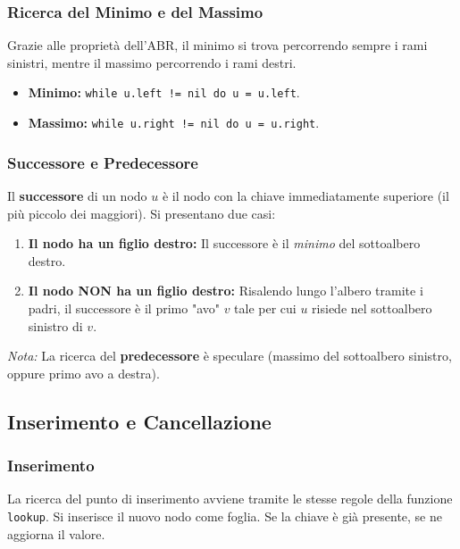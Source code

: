 \documentclass[12pt, a4paper]{article}
\begin{document}
\subsubsection{Ricerca del Minimo e del Massimo}
Grazie alle proprietà dell'ABR, il minimo si trova percorrendo sempre i rami sinistri, mentre il massimo percorrendo i rami destri.
\begin{itemize}
\item \textbf{Minimo:} \texttt{while u.left != nil do u = u.left}.
\item \textbf{Massimo:} \texttt{while u.right != nil do u = u.right}.
\end{itemize}

\subsubsection{Successore e Predecessore}
Il \textbf{successore} di un nodo $u$ è il nodo con la chiave immediatamente superiore (il più piccolo dei maggiori). Si presentano due casi:
\begin{enumerate}
\item \textbf{Il nodo ha un figlio destro:} Il successore è il \textit{minimo} del sottoalbero destro.
\item \textbf{Il nodo NON ha un figlio destro:} Risalendo lungo l'albero tramite i padri, il successore è il primo "avo" $v$ tale per cui $u$ risiede nel sottoalbero sinistro di $v$.
\end{enumerate}
\textit{Nota:} La ricerca del \textbf{predecessore} è speculare (massimo del sottoalbero sinistro, oppure primo avo a destra).

\subsection{Inserimento e Cancellazione}

\subsubsection{Inserimento}
La ricerca del punto di inserimento avviene tramite le stesse regole della funzione \texttt{lookup}. Si inserisce il nuovo nodo come foglia. Se la chiave è già presente, se ne aggiorna il valore.
\end{document}
